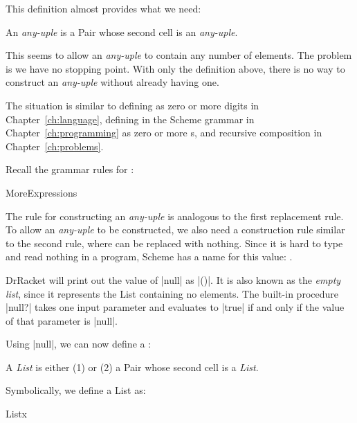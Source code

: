 \begin{schemeregion}
This definition almost provides what we need: 
\begin{smallquote}
An \emph{any-uple} is a Pair whose second cell is an \emph{any-uple}.
\end{smallquote}

This seems to allow an \emph{any-uple} to contain any number of elements.  The problem is we have no stopping point.  With only the definition above, there is no way to construct an \emph{any-uple} without already having one.  

The situation is similar to defining  as zero or more digits in Chapter~\ref{ch:language}, defining  in the Scheme grammar in Chapter~\ref{ch:programming} as zero or more s, and recursive composition in Chapter~\ref{ch:problems}. 

Recall the grammar rules for :
\begin{bnfgrammarm}{MoreExpressions}
\end{bnfgrammarm}
The rule for constructing an \emph{any-uple} is analogous to the first  replacement rule.  To allow an \emph{any-uple} to be constructed, we also need a construction rule similar to the second rule, where  can be replaced with nothing.  Since it is hard to type and read nothing in a program, Scheme has a name for this value: .  

DrRacket will print out the value of \scheme|null| as \schemeresult|()|.  It is also known as the \emph{empty list}, since it represents the List containing no elements.  The built-in procedure \scheme|null?| takes one input parameter and evaluates to \schemeresult|true| if and only if the value of that parameter is \schemeresult|null|.

Using \schemeresult|null|, we can now define a : 
\begin{smallquote}
A \emph{List} is either (1)  or (2) a Pair whose second cell is a \emph{List}.
\end{smallquote}

Symbolically, we define a List as:
\begin{bnfgrammarm}{Listx}
\end{bnfgrammarm}


\end{schemeregion}
